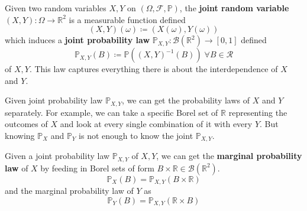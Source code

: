 \documentclass{article}
\begin{document}
    \begin{definition}
      Given two random variables $X, Y$ on $(\Omega, \mathcal{F}, \mathbb{P})$, the \textbf{joint random variable} $(X, Y): \Omega \longrightarrow \mathbb{R}^2$ is a measurable function defined 
      \begin{equation}
        (X, Y) (\omega) \coloneqq (X(\omega), Y(\omega))
      \end{equation}
      which induces a \textbf{joint probability law} $\mathbb{P}_{X, Y}: \mathcal{B}(\mathbb{R}^2) \longrightarrow [0, 1]$ defined 
      \begin{equation}
        \mathbb{P}_{X, Y}(B) \coloneqq \mathbb{P}((X, Y)^{-1}(B)) \; \forall B \in \mathcal{R}
      \end{equation}
      of $X, Y$. This law captures everything there is about the interdependence of $X$ and $Y$. 
    \end{definition}

    Given joint probability law $\mathbb{P}_{X, Y}$, we can get the probability laws of $X$ and $Y$ separately. For example, we can take a specific Borel set of $\mathbb{R}$ representing the outcomes of $X$ and look at every single combination of it with every $Y$. But knowing $\mathbb{P}_X$ and $\mathbb{P}_Y$ is not enough to know the joint $\mathbb{P}_{X, Y}$. 

    \begin{definition}
      Given a joint probability law $\mathbb{P}_{X, Y}$ of $X, Y$, we can get the \textbf{marginal probability law} of $X$ by feeding in Borel sets of form $B \times \mathbb{R} \in \mathcal{B}(\mathbb{R}^2)$. 
      \begin{equation}
        \mathbb{P}_X (B) = \mathbb{P}_{X, Y} (B \times \mathbb{R})
      \end{equation}
      and the marginal probability law of $Y$ as 
      \begin{equation}
        \mathbb{P}_Y (B) = \mathbb{P}_{X, Y} (\mathbb{R} \times B)
      \end{equation}
    \end{definition}
\end{document}
